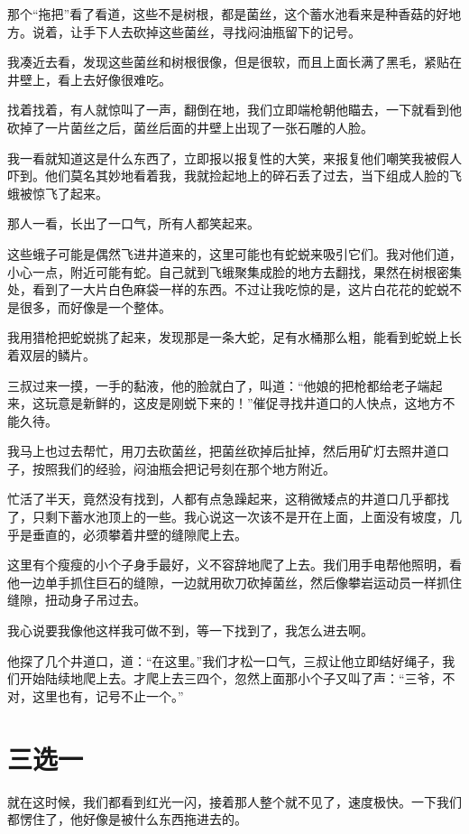 那个“拖把”看了看道，这些不是树根，都是菌丝，这个蓄水池看来是种香菇的好地方。说着，让手下人去砍掉这些菌丝，寻找闷油瓶留下的记号。

我凑近去看，发现这些菌丝和树根很像，但是很软，而且上面长满了黑毛，紧贴在井壁上，看上去好像很难吃。

找着找着，有人就惊叫了一声，翻倒在地，我们立即端枪朝他瞄去，一下就看到他砍掉了一片菌丝之后，菌丝后面的井壁上出现了一张石雕的人脸。

我一看就知道这是什么东西了，立即报以报复性的大笑，来报复他们嘲笑我被假人吓到。他们莫名其妙地看着我，我就捡起地上的碎石丢了过去，当下组成人脸的飞蛾被惊飞了起来。

那人一看，长出了一口气，所有人都笑起来。

这些蛾子可能是偶然飞进井道来的，这里可能也有蛇蜕来吸引它们。我对他们道，小心一点，附近可能有蛇。自己就到飞蛾聚集成脸的地方去翻找，果然在树根密集处，看到了一大片白色麻袋一样的东西。不过让我吃惊的是，这片白花花的蛇蜕不是很多，而好像是一个整体。

我用猎枪把蛇蜕挑了起来，发现那是一条大蛇，足有水桶那么粗，能看到蛇蜕上长着双层的鳞片。

三叔过来一摸，一手的黏液，他的脸就白了，叫道：“他娘的把枪都给老子端起来，这玩意是新鲜的，这皮是刚蜕下来的！”催促寻找井道口的人快点，这地方不能久待。

我马上也过去帮忙，用刀去砍菌丝，把菌丝砍掉后扯掉，然后用矿灯去照井道口子，按照我们的经验，闷油瓶会把记号刻在那个地方附近。

忙活了半天，竟然没有找到，人都有点急躁起来，这稍微矮点的井道口几乎都找了，只剩下蓄水池顶上的一些。我心说这一次该不是开在上面，上面没有坡度，几乎是垂直的，必须攀着井壁的缝隙爬上去。

这里有个瘦瘦的小个子身手最好，义不容辞地爬了上去。我们用手电帮他照明，看他一边单手抓住巨石的缝隙，一边就用砍刀砍掉菌丝，然后像攀岩运动员一样抓住缝隙，扭动身子吊过去。

我心说要我像他这样我可做不到，等一下找到了，我怎么进去啊。

他探了几个井道口，道：“在这里。”我们才松一口气，三叔让他立即结好绳子，我们开始陆续地爬上去。才爬上去三四个，忽然上面那小个子又叫了声：“三爷，不对，这里也有，记号不止一个。”

\chapter{三选一}

就在这时候，我们都看到红光一闪，接着那人整个就不见了，速度极快。一下我们都愣住了，他好像是被什么东西拖进去的。

